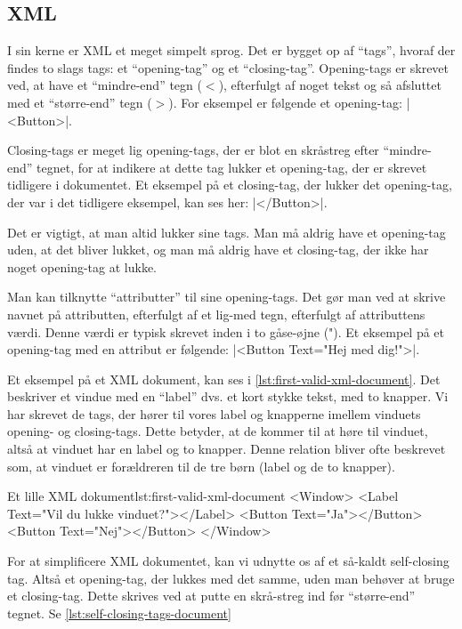 \subsection{XML}
I sin kerne er XML et meget simpelt sprog. Det er bygget op af ``tags'', hvoraf 
der findes to slags tags: et ``opening-tag'' og et ``closing-tag''. 
Opening-tags er skrevet ved, at have et ``mindre-end'' tegn ($<$), efterfulgt af 
noget tekst og så afsluttet med et ``større-end'' tegn ($>$). For eksempel er 
følgende et opening-tag: \XmlInline|<Button>|.

Closing-tags er meget lig opening-tags, der er blot en skråstreg efter 
``mindre-end'' tegnet, for at indikere at dette tag lukker et opening-tag, der 
er skrevet tidligere i dokumentet. Et eksempel på et closing-tag, der lukker 
det opening-tag, der var i det tidligere eksempel, kan ses her: 
\XmlInline|</Button>|.

Det er vigtigt, at man altid lukker sine tags. Man må aldrig have et opening-tag uden, at det bliver lukket, og man må aldrig have et closing-tag, der ikke har noget opening-tag at lukke.

Man kan tilknytte ``attributter'' til sine opening-tags. Det gør man ved at 
skrive navnet på attributten, efterfulgt af et lig-med tegn, efterfulgt af 
attributtens værdi. Denne værdi er typisk skrevet inden i to gåse-øjne ("). Et 
eksempel på et opening-tag med en attribut er følgende: 
\XmlInline|<Button Text="Hej med dig!">|.

Et eksempel på et XML dokument, kan ses i \autoref{lst:first-valid-xml-document}. Det beskriver et vindue med en ``label'' dvs. et kort stykke tekst, med to knapper. Vi har skrevet de tags, der hører til vores label og knapperne imellem vinduets opening- og closing-tags. Dette betyder, at de kommer til at høre til vinduet, altså at vinduet har en label og to knapper. Denne relation bliver ofte beskrevet som, at 
vinduet er forældreren til de tre børn (label og de to knapper).

\begin{example}
	\begin{XmlCode}{Et lille XML dokument}{lst:first-valid-xml-document}
		<Window>
			<Label Text="Vil du lukke vinduet?"></Label>
			<Button Text="Ja"></Button>
			<Button Text="Nej"></Button>
		</Window>
	\end{XmlCode}
\end{example}


For at simplificere XML dokumentet, kan vi udnytte os af et så-kaldt 
self-closing tag. Altså et opening-tag, der lukkes med det samme, uden man 
behøver at bruge et closing-tag. Dette skrives ved at putte en skrå-streg ind 
før ``større-end'' tegnet. Se \autoref{lst:self-closing-tags-document}

